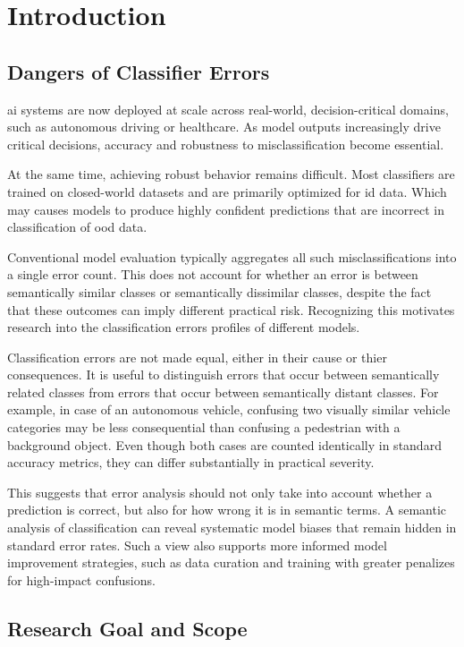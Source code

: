 \chapter{Introduction}
\label{chapt:Introduction}

\section{Dangers of Classifier Errors}

\ac{ai} systems are now deployed at scale across real-world, decision-critical domains, such as autonomous driving or healthcare.
As model outputs increasingly drive critical decisions, accuracy and robustness to misclassification become essential.

At the same time, achieving robust behavior remains difficult.
Most classifiers are trained on closed-world datasets and are primarily optimized for \ac{id} data.
Which may causes models to produce highly confident predictions that are incorrect in classification of \ac{ood} data.

Conventional model evaluation typically aggregates all such misclassifications into a single error count.
This does not account for whether an error is between semantically similar classes or semantically dissimilar classes,
despite the fact that these outcomes can imply different practical risk.
Recognizing this motivates research into the classification errors profiles of different models.

Classification errors are not made equal, either in their cause or thier consequences.
It is useful to distinguish errors that occur between semantically related classes from errors that occur between semantically distant classes.
For example, in case of an autonomous vehicle, confusing two visually similar vehicle categories may be less consequential than confusing a pedestrian with a background object.
Even though both cases are counted identically in standard accuracy metrics, they can differ substantially in practical severity.

This suggests that error analysis should not only take into account whether a prediction is correct, but also for how wrong it is in semantic terms.
A semantic analysis of classification can reveal systematic model biases that remain hidden in standard error rates.
Such a view also supports more informed model improvement strategies, such as data curation and training with greater penalizes for high-impact confusions.

\section{Research Goal and Scope}

